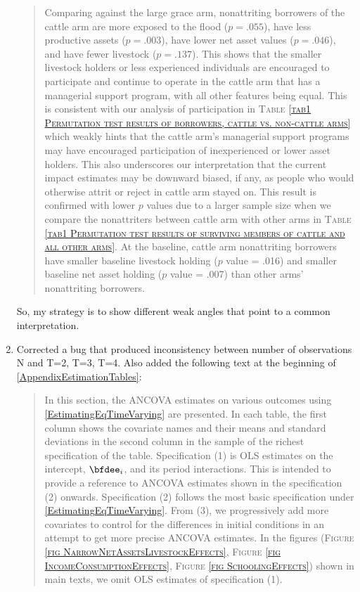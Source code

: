 \begin{enumerate}
\begin{quotation}
	Comparing against the \textsf{large grace} arm, nonattriting borrowers of the \textsf{cattle} arm are more exposed to the flood ($p=.055$), have less productive assets ($p=.003$), have lower net asset values ($p=.046$), and have fewer livestock ($p=.137$). This shows that the smaller livestock holders or less experienced individuals are encouraged to participate and continue to operate in the \textsf{cattle} arm that has a managerial support program, with all other features being equal. This is consistent with our analysis of participation in \textsc{\normalsize Table \ref{tab1 Permutation test results of borrowers, cattle vs. non-cattle arms}} which weakly hints that the \textsf{cattle} arm's managerial support programs may have encouraged participation of inexperienced or lower asset holders. This also underscores our interpretation that the current impact estimates may be downward biased, if any, as people who would otherwise attrit or reject in cattle arm stayed on. This result is confirmed with lower $p$ values due to a larger sample size when we compare the nonattriters between \textsf{cattle} arm with other arms in \textsc{\normalsize Table \ref{tab1 Permutation test results of surviving members of cattle and all other arms}}. At the baseline, \textsf{cattle} arm nonattriting borrowers have smaller baseline livestock holding ($p$ value = .016) and smaller baseline net asset holding ($p$ value = .007) than other arms' nonattriting borrowers. 
\end{quotation}
So, my strategy is to show different weak angles that point to a common interpretation.
\item	Corrected a bug that produced inconsistency between number of observations \textsf{N} and \textsf{T=2, T=3, T=4}. Also added the following text at the beginning of \ref{AppendixEstimationTables}:
\begin{quotation}
	\hspace{1em}In this section, the ANCOVA estimates on various outcomes using %
	\eqref{EstimatingEqTimeVarying} are presented. In each table, the first column shows the covariate names and their means and standard deviations in the second column in the sample of the richest specification of the table. Specification (1) is OLS estimates on the intercept, $\bfdee_{i}$, and its period interactions. This is intended to provide a reference to ANCOVA estimates shown in the specification (2) onwards. Specification (2) follows the most basic specification under \eqref{EstimatingEqTimeVarying}. From (3), we progressively add more covariates to control for the differences in initial conditions in an attempt to get more precise ANCOVA estimates. In the figures (\textsc{\footnotesize Figure \ref{fig NarrowNetAssetsLivestockEffects}}, \textsc{\small Figure \ref{fig IncomeConsumptionEffects}}, \textsc{\footnotesize Figure \ref{fig SchoolingEffects}}) shown in main texts, we omit OLS estimates of specification (1). 
	

\end{quotation}
\end{enumerate}
